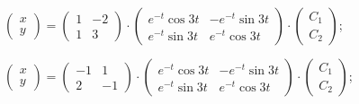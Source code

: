 \begin{enumsolsfull}
		\item \( \begin{pmatrix} x \\ y \end{pmatrix} = \begin{pmatrix} 1 & -2 \\ 1 & 3 \end{pmatrix} \cdot \begin{pmatrix} e^{-t} \cos{3t} & -e^{-t} \sin{3t} \\ e^{-t} \sin{3t} & e^{-t} \cos{3t} \end{pmatrix} \cdot \begin{pmatrix} C_1 \\ C_2 \end{pmatrix} \); %
		\item \( \begin{pmatrix} x \\ y \end{pmatrix} = \begin{pmatrix} -1 & 1 \\ 2 & -1 \end{pmatrix} \cdot \begin{pmatrix} e^{-t} \cos{3t} & -e^{-t} \sin{3t} \\ e^{-t} \sin{3t} & e^{-t} \cos{3t} \end{pmatrix} \cdot \begin{pmatrix} C_1 \\ C_2 \end{pmatrix} \); %


\end{enumsolsfull}

